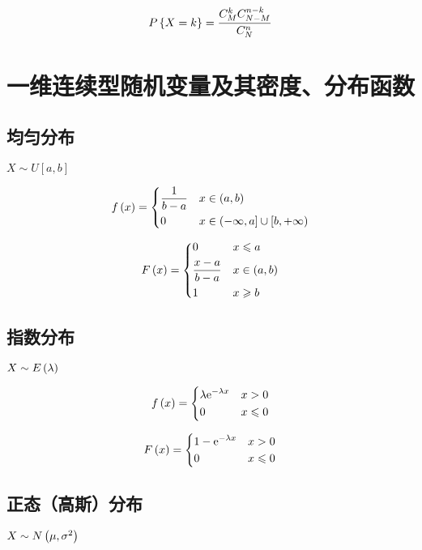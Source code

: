 \documentclass{article}
\begin{document}
\[P\left\{X=k\right\}=\frac{C_M^kC_{N-M}^{n-k}}{C_N^n}\]

\section{一维连续型随机变量及其密度、分布函数}

\subsection{均匀分布}

$X\sim U\left[a,b\right]$

\[f\left(x\right)=\left\{\begin{aligned}
         & \frac1{b-a} &  & x\in\left(a,b\right)                                          \\
         & 0           &  & x\in\left(-\infty,a\right]\cup\left[b,+\infty\right)
    \end{aligned}\right.\]

\[F\left(x\right)=\left\{\begin{aligned}
         & 0               &  & x\leqslant a \\
         & \frac{x-a}{b-a} &  & x\in\left(a,b\right)  \\
         & 1               &  & x\geqslant b
    \end{aligned}\right.\]

\subsection{指数分布}

$X\sim E\left(\lambda\right)$

\[f\left(x\right)=\left\{\begin{aligned}
         & \lambda\mathrm e^{-\lambda x} &  & x>0         \\
         & 0                      &  & x\leqslant0
    \end{aligned}\right.\]

\[F\left(x\right)=\left\{\begin{aligned}
         & 1-\mathrm e^{-\lambda x} &  & x>0         \\
         & 0                 &  & x\leqslant0
    \end{aligned}\right.\]

\subsection{正态（高斯）分布}

$X\sim N\left(\mu,\sigma^2\right)$
\end{document}
